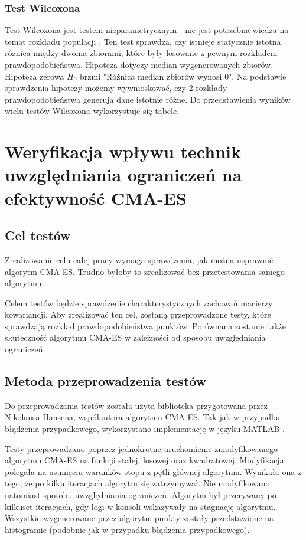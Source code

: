 \documentclass{mini}
\newcommand{\CMAES}{\mbox{CMA-ES}}
\begin{document}
\subsubsection*{Test Wilcoxona}
Test Wilcoxona jest testem nieparametrycznym - nie jest potrzebna wiedza na temat rozkładu populacji \cite{wilcox}. Ten test sprawdza, czy istnieje statycznie istotna różnica między dwoma zbiorami, które były losowane z pewnym rozkładem prawdopodobieństwa. Hipoteza dotyczy median wygenerowanych zbiorów. Hipoteza zerowa $H_0$ brzmi "Różnica median zbiorów wynosi 0". Na podstawie sprawdzenia hipotezy możemy wywnioskować, czy 2 rozkłady prawdopodobieństwa generują dane istotnie różne. Do przedstawienia wyników wielu testów Wilcoxona wykorzystuje się tabele.

\pagebreak

\section{Weryfikacja wpływu technik uwzględniania ograniczeń na efektywność CMA-ES}

\subsection{Cel testów}
Zrealizowanie celu całej pracy wymaga sprawdzenia, jak można usprawnić algorytm \CMAES. Trudno byłoby to zrealizować bez przetestowania samego algorytmu.

Celem testów będzie sprawdzenie charakterystycznych zachowań macierzy kowariancji. Aby zrealizować ten cel, zostaną przeprowadzone testy, które sprawdzają rozkład prawdopodobieństwa punktów. Porównana zostanie także skuteczność algorytmu CMA-ES w zależności od sposobu uwzględniania ograniczeń.

\subsection{Metoda przeprowadzenia testów}
Do przeprowadzania testów została użyta biblioteka przygotowana przez Nikolausa Hansena, współautora algorytmu CMA-ES. Tak jak w przypadku błądzenia przypadkowego, wykorzystano implementację w języku MATLAB \cite{cmaes_code}.

Testy przeprowadzano poprzez jednokrotne uruchomienie zmodyfikowanego algorytmu CMA-ES na funkcji stałej, losowej oraz kwadratowej. Modyfikacja polegała na usunięciu warunków stopu z pętli głównej algorytmu. Wynikała ona z tego, że po kilku iteracjach algorytm się zatrzymywał. Nie modyfikowano natomiast sposobu uwzględniania ograniczeń. Algorytm był przerywany po kilkuset iteracjach, gdy logi w konsoli wskazywały na stagnację algorytmu. Wszystkie wygenerowane przez algorytm punkty zostały przedstawione na histogramie (podobnie jak w przypadku błądzenia przypadkowego).
\end{document}
